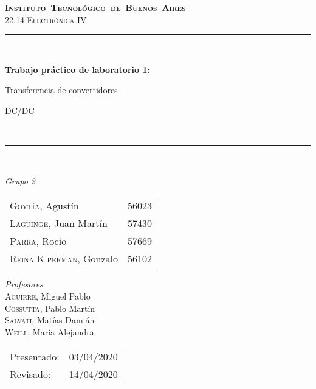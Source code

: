 
\begin{titlepage}
\newcommand{\HRule}{\rule{\linewidth}{0.5mm}}
\center
\mbox{\textsc{\LARGE \bfseries {Instituto Tecnol\'ogico de Buenos Aires}}}\\[1.5cm]
\textsc{\Large 22.14 Electr\'onica IV}\\[0.5cm]


\HRule \\[0.6cm]
{ \Huge \bfseries Trabajo pr\'actico de laboratorio  1: 

 Transferencia de convertidores 

\vspace{0.4cm} 
 DC/DC}\\[0.4cm] %
\HRule \\[1.5cm]


{\large

\emph{Grupo 2}\\
\vspace{3px}

\begin{tabular}{lr} 	
\textsc{Goyt\'ia}, Agust\'in  & 56023 \\
\textsc{Laguinge}, Juan Mart\'in  & 57430 \\
\textsc{Parra}, Roc\'io  & 57669 \\
\textsc{Reina Kiperman}, Gonzalo  & 56102 \\
\end{tabular}

\vspace{20px}

\emph{Profesores}\\
\vspace{3px}
\textsc{Aguirre}, Miguel Pablo\\ 
\textsc{Cossutta}, Pablo Mart\'in\\ 
\textsc{Salvati}, Mat\'ias Dami\'an\\	
\textsc{Weill}, Mar\'ia Alejandra\\ 	

\vspace{100px}

\begin{tabular}{ll}

Presentado: & 03/04/2020\\
Revisado: & 14/04/2020

\end{tabular}

}

\vfill

\end{titlepage}